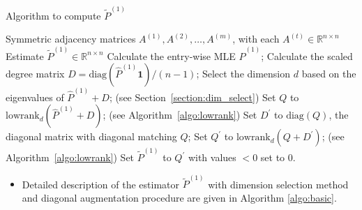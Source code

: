 \documentclass[a4paper]{article}
\renewcommand{\hat}{\widehat}
\begin{document}
\begin{algorithm}[H]
\caption{Algorithm to compute $\widetilde{P}^{(1)}$}
\label{algo:basic}
\begin{algorithmic}[1]
\REQUIRE Symmetric adjacency matrices $A^{(1)}, A^{(2)}, \dotsc, A^{(m)}$, with each $A^{(t)} \in \mathbb{R}^{n \times n}$
\ENSURE Estimate $\widetilde{P}^{(1)} \in \mathbb{R}^{n \times n}$
\STATE Calculate the entry-wise MLE $\hat{P}^{(1)}$;
\STATE Calculate the scaled degree matrix $D = \mathrm{diag}(\hat{P}^{(1)} \bm{1})/(n-1)$;
\STATE Select the dimension $d$ based on the eigenvalues of $\hat{P}^{(1)} + D$; (see Section~\ref{section:dim_select})
\STATE Set $Q$ to $\mathrm{lowrank}_d(\hat{P}^{(1)} + D)$; (see Algorithm~\ref{algo:lowrank})
\STATE Set $D^{\prime}$ to $ \mathrm{diag}(Q)$, the diagonal matrix with diagonal matching $Q$; 
\STATE Set $Q^{\prime}$ to $\mathrm{lowrank}_d(Q + D^{\prime})$; (see Algorithm~\ref{algo:lowrank})
\STATE Set $\widetilde{P}^{(1)}$ to $Q^{\prime}$ with values $<0$ set to $0$.
\end{algorithmic}
\end{algorithm}

\begin{itemize}
\item Detailed description of the estimator $\widetilde{P}^{(1)}$ with dimension selection method and diagonal augmentation procedure are given in Algorithm \ref{algo:basic}.
\end{itemize}
\end{document}
